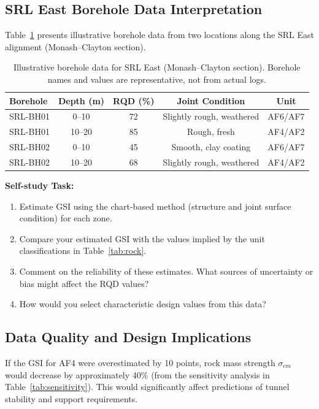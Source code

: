 \subsection{SRL East Borehole Data Interpretation}
Table~\ref{tab:borehole} presents illustrative borehole data from two locations along the SRL East alignment (Monash--Clayton section).

\begin{table}[h!]
\centering
\small
\begin{tabular}{lcccc}
\toprule
\textbf{Borehole} & \textbf{Depth (m)} & \textbf{RQD (\%)} & \textbf{Joint Condition} & \textbf{Unit} \\
\midrule
SRL-BH01 & 0--10 & 72 & Slightly rough, weathered & AF6/AF7 \\
SRL-BH01 & 10--20 & 85 & Rough, fresh & AF4/AF2 \\
SRL-BH02 & 0--10 & 45 & Smooth, clay coating & AF6/AF7 \\
SRL-BH02 & 10--20 & 68 & Slightly rough, weathered & AF4/AF2 \\
\bottomrule
\end{tabular}
\caption{Illustrative borehole data for SRL East (Monash--Clayton section). Borehole names and values are representative, not from actual logs.}
\label{tab:borehole}
\end{table}

\textbf{Self-study Task:}
\begin{enumerate}
 \item Estimate GSI using the chart-based method (structure and joint surface condition) for each zone.
 \item Compare your estimated GSI with the values implied by the unit classifications in Table~\ref{tab:rock}.
 \item Comment on the reliability of these estimates. What sources of uncertainty or bias might affect the RQD values?
 \item How would you select characteristic design values from this data?
\end{enumerate}

\subsection{Data Quality and Design Implications}

\begin{warnbox}
If the GSI for AF4 were overestimated by 10 points, rock mass strength $\sigma_{cm}$ would decrease by approximately 40\% (from the sensitivity analysis in Table~\ref{tab:sensitivity}). This would significantly affect predictions of tunnel stability and support requirements.
\end{warnbox}


